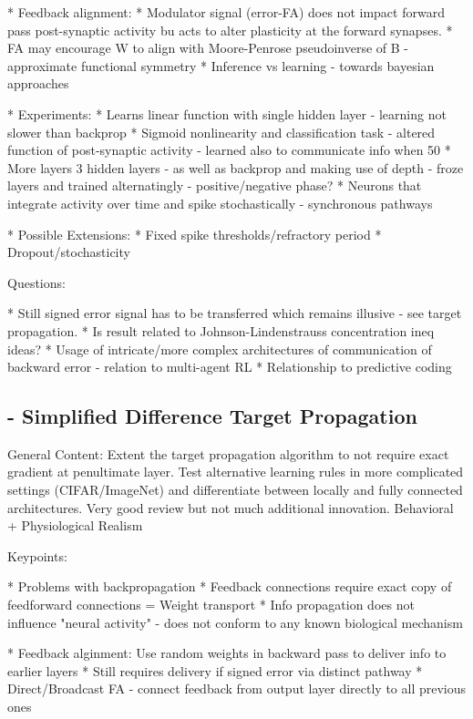\documentclass{article}
\theoremstyle{definition}
\begin{document}
* Feedback alignment:
    * Modulator signal (error-FA) does not impact forward pass post-synaptic activity bu acts to alter plasticity at the forward synapses.
    * FA may encourage W to align with Moore-Penrose pseudoinverse of B - approximate functional symmetry
    * Inference vs learning - towards bayesian approaches

* Experiments:
    * Learns linear function with single hidden layer - learning not slower than backprop
    * Sigmoid nonlinearity and classification task - altered function of post-synaptic activity - learned also to communicate info when 50%
    * More layers 3 hidden layers - as well as backprop and making use of depth - froze layers and trained alternatingly - positive/negative phase?
    * Neurons that integrate activity over time and spike stochastically - synchronous pathways

* Possible Extensions:
    * Fixed spike thresholds/refractory period
    * Dropout/stochasticity

Questions:

* Still signed error signal has to be transferred which remains illusive - see target propagation.
* Is result related to Johnson-Lindenstrauss concentration ineq ideas?
* Usage of intricate/more complex architectures of communication of backward error - relation to multi-agent RL
* Relationship to predictive coding


\subsection*{\citet{bartunov2018} - Simplified Difference Target Propagation}

General Content: Extent the target propagation algorithm to not require exact gradient at penultimate layer. Test alternative learning rules in more complicated settings (CIFAR/ImageNet) and differentiate between locally and fully connected architectures. Very good review but not much additional innovation. Behavioral + Physiological Realism


Keypoints:

* Problems with backpropagation
    * Feedback connections require exact copy of feedforward connections = Weight transport
    * Info propagation does not influence "neural activity" - does not conform to any known biological mechanism

* Feedback alginment: Use random weights in backward pass to deliver info to earlier layers
    * Still requires delivery if signed error via distinct pathway
    * Direct/Broadcast FA - connect feedback from output layer directly to all previous ones
\end{document}

